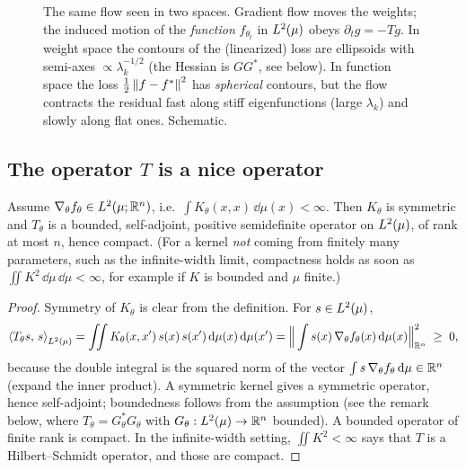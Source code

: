 \begin{figure}[tb]
\caption{The same flow seen in two spaces. Gradient flow moves the weights; the induced motion of the \emph{function} $f_{\theta_t}$ in $L^2(\mu)$ obeys $\partial_tg=-Tg$. In weight space the contours of the (linearized) loss are ellipsoids with semi-axes $\propto\lambda_k^{-1/2}$ (the Hessian is $GG^*$, see below). In function space the loss $\frac12\left\lVert f-f^*\right\rVert^2$ has \emph{spherical} contours, but the flow contracts the residual fast along stiff eigenfunctions (large $\lambda_k$) and slowly along flat ones. Schematic.}
\label{fig:L2-spaces}
\end{figure}

\subsection{The operator \texorpdfstring{$T$}{T} is a nice operator}\label{sec:L2-Tprops}
\begin{lem}\label{lem:T}
Assume $\nabla_\theta f_\theta\in L^2(\mu;\mathbb{R}^n)$, i.e.\ $\int K_\theta(x,x)\,\dd\mu(x)<\infty$. Then $K_\theta$ is symmetric and $T_\theta$ is a bounded, self-adjoint, positive semidefinite operator on $L^2(\mu)$, of rank at most $n$, hence compact. (For a kernel \emph{not} coming from finitely many parameters, such as the infinite-width limit, compactness holds as soon as $\iint K^2\,\dd\mu\,\dd\mu<\infty$, for example if $K$ is bounded and $\mu$ finite.)
\end{lem}
\begin{proof}
Symmetry of $K_\theta$ is clear from the definition. For $s\in L^2(\mu)$,
\[
  \left\langle T_\theta s,\,s\right\rangle_{L^2(\mu)}=\iint K_\theta(x,x')\,s(x)\,s(x')\,\mathrm{d}\mu(x)\,\mathrm{d}\mu(x')=\Big\lVert\int s(x)\,\nabla_\theta f_\theta(x)\,\mathrm{d}\mu(x)\Big\rVert^2_{\mathbb{R}^n}\;\ge\;0,
\]
because the double integral is the squared norm of the vector $\int s\,\nabla_\theta f_\theta\,\mathrm{d}\mu\in\mathbb{R}^n$ (expand the inner product). A symmetric kernel gives a symmetric operator, hence self-adjoint; boundedness follows from the assumption (see the remark below, where $T_\theta=G_\theta^*G_\theta$ with $G_\theta:L^2(\mu)\to\mathbb{R}^n$ bounded). A bounded operator of finite rank is compact. In the infinite-width setting, $\iint K^2<\infty$ says that $T$ is a Hilbert--Schmidt operator, and those are compact.
\end{proof}

